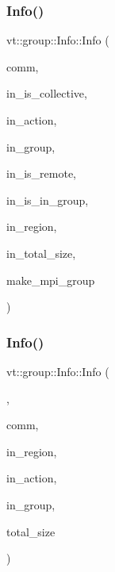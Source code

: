 \subsubsection{\texorpdfstring{Info()}{Info()}\hspace{0.1cm}{\footnotesize\ttfamily [1/4]}}
{\footnotesize\ttfamily vt\+::group\+::\+Info\+::\+Info (\begin{DoxyParamCaption}\item[{M\+P\+I\+\_\+\+Comm}]{comm,  }\item[{bool const \&}]{in\+\_\+is\+\_\+collective,  }\item[{\hyperlink{namespacevt_ae0a5a7b18cc99d7b732cb4d44f46b0f3}{Action\+Type}}]{in\+\_\+action,  }\item[{\hyperlink{namespacevt_a27b5e4411c9b6140c49100e050e2f743}{Group\+Type} const}]{in\+\_\+group,  }\item[{bool const \&}]{in\+\_\+is\+\_\+remote,  }\item[{bool const \&}]{in\+\_\+is\+\_\+in\+\_\+group,  }\item[{\hyperlink{structvt_1_1group_1_1_info_rooted_a127ac5ebcfb9871621c1f66dba481c0b}{Region\+Ptr\+Type}}]{in\+\_\+region,  }\item[{\hyperlink{structvt_1_1group_1_1region_1_1_region_a9bb381adf31111aae34dbc644bad6c1f}{Region\+Type\+::\+Size\+Type} const \&}]{in\+\_\+total\+\_\+size,  }\item[{bool}]{make\+\_\+mpi\+\_\+group }\end{DoxyParamCaption})\hspace{0.3cm}{\ttfamily [protected]}}

\mbox{\label{structvt_1_1group_1_1_info_afe28218871a3b83a304bff5e72055eae}} 
\subsubsection{\texorpdfstring{Info()}{Info()}\hspace{0.1cm}{\footnotesize\ttfamily [2/4]}}
{\footnotesize\ttfamily vt\+::group\+::\+Info\+::\+Info (\begin{DoxyParamCaption}\item[{Info\+Rooted\+Local\+Cons\+Type}]{,  }\item[{M\+P\+I\+\_\+\+Comm}]{comm,  }\item[{\hyperlink{structvt_1_1group_1_1_info_rooted_a127ac5ebcfb9871621c1f66dba481c0b}{Region\+Ptr\+Type}}]{in\+\_\+region,  }\item[{\hyperlink{namespacevt_ae0a5a7b18cc99d7b732cb4d44f46b0f3}{Action\+Type}}]{in\+\_\+action,  }\item[{\hyperlink{namespacevt_a27b5e4411c9b6140c49100e050e2f743}{Group\+Type} const}]{in\+\_\+group,  }\item[{\hyperlink{structvt_1_1group_1_1region_1_1_region_a9bb381adf31111aae34dbc644bad6c1f}{Region\+Type\+::\+Size\+Type} const \&}]{total\+\_\+size }\end{DoxyParamCaption})}

